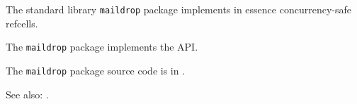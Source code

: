 
The standard library {\tt maildrop} package implements in essence concurrency-safe refcells.

The {\tt maildrop} package implements the  API.

The {\tt maildrop} package source code is in .

See also: .


